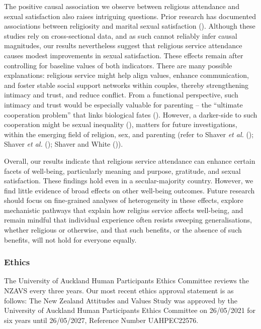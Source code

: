 \documentclass[
  single column]{article}
\begin{document}
The positive causal association we observe between religious attendance
and sexual satisfaction also raises intriguing questions. Prior research
has documented associations between religiosity and marital sexual
satisfaction ().
Although these studies rely on cross-sectional data, and as such cannot
reliably infer causal magnitudes, our results nevertheless suggest that
religious service attendance causes modest improvements in sexual
satisfaction. These effects remain after controlling for baseline values
of both indicators. There are many possible explanations: religious
service might help align values, enhance communication, and foster
stable social support networks within couples, thereby strengthening
intimacy and trust, and reduce conflict. From a functional perspective,
such intimacy and trust would be especially valuable for parenting --
the ``ultimate cooperation problem'' that links biological fates
(). However, a
darker-side to such cooperation might be sexual inequality
(), matters
for future investigations, within the emerging field of religion, sex,
and parenting (refer to Shaver \emph{et al.}
(); Shaver \emph{et al.}
(); Shaver and White
()).

Overall, our results indicate that religious service attendance can
enhance certain facets of well-being, particularly meaning and purpose,
gratitude, and sexual satisfaction. These findings hold even in a
secular-majority country. However, we find little evidence of broad
effects on other well-being outcomes. Future research should focus on
fine-grained analyses of heterogeneity in these effects, explore
mechanistic pathways that explain how religius service affects
well-being, and remain mindful that individual experience often resists
sweeping generalisations, whether religious or otherwise, and that such
benefits, or the absence of such benefits, will not hold for everyone
equally.

\subsubsection{Ethics}\label{ethics}

The University of Auckland Human Participants Ethics Committee reviews
the NZAVS every three years. Our most recent ethics approval statement
is as follows: The New Zealand Attitudes and Values Study was approved
by the University of Auckland Human Participants Ethics Committee on
26/05/2021 for six years until 26/05/2027, Reference Number UAHPEC22576.
\end{document}
